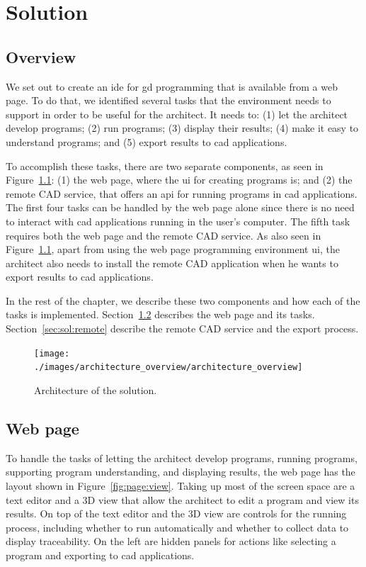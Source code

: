 
\chapter{Solution}
\label{chapter:solution}


\section{Overview}
We set out to create an \gls{ide} for \gls{gd} programming that is available from a web page.
To do that, we identified several tasks that the environment needs to support in order to be useful for the architect.
It needs to:
(1) let the architect develop programs;
(2) run programs;
(3) display their results;
(4) make it easy to understand programs;
and (5) export results to \gls{cad} applications.

To accomplish these tasks, there are two separate components, as seen in Figure~\ref{fig:archi:sol}: (1) the web page, where the \gls{ui} for creating programs is; and (2) the remote CAD service, that offers an \gls{api} for running programs in \gls{cad} applications.
The first four tasks can be handled by the web page alone since there is no need to interact with \gls{cad} applications running in the user's computer.
The fifth task requires both the web page and the remote CAD service.
As also seen in Figure~\ref{fig:archi:sol}, apart from using the web page programming environment \gls{ui}, the architect also needs to install the remote CAD application when he wants to export results to \gls{cad} applications.

In the rest of the chapter, we describe these two components and how each of the tasks is implemented.
Section~\ref{sec:sol:page} describes the web page and its tasks.
Section~\ref{sec:sol:remote} describe the remote CAD service and the export process.

\begin{figure}
  \centering
  \texttt{[image: ./images/architecture\_overview/architecture\_overview]}
  \caption{Architecture of the solution.}
  \label{fig:archi:sol}
\end{figure}


\section{Web page}
\label{sec:sol:page}
To handle the tasks of letting the architect develop programs, running programs, supporting program understanding, and displaying results, the web page has the layout shown in Figure~\ref{fig:page:view}.
Taking up most of the screen space are a text editor and a 3D view that allow the architect to edit a program and view its results.
On top of the text editor and the 3D view are controls for the running process, including whether to run automatically and whether to collect data to display traceability.
On the left are hidden panels for actions like selecting a program and exporting to \gls{cad} applications.

